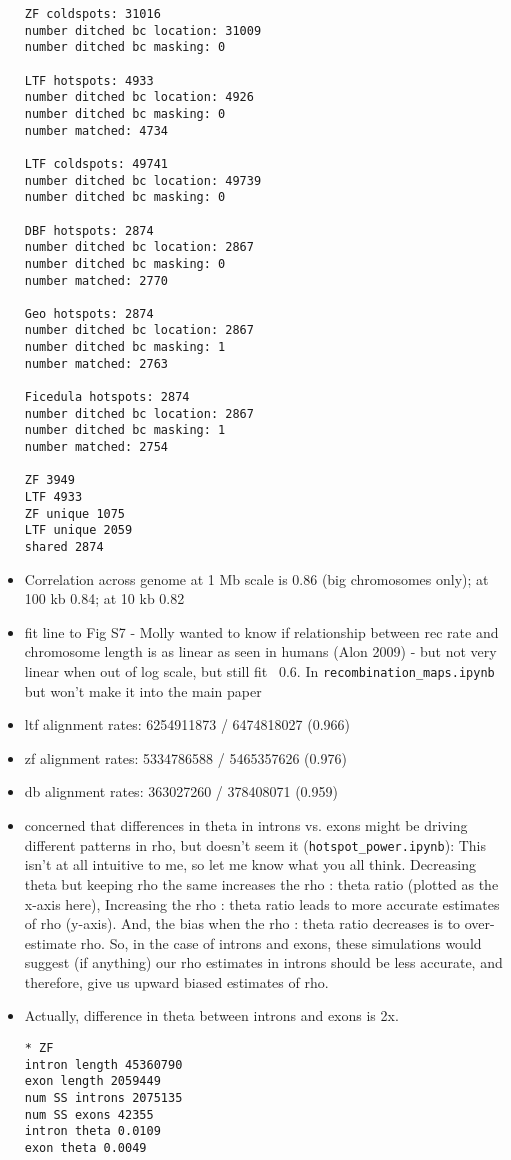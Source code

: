 \documentclass[idxtotoc,hyperref,openany,oneside]{labbook} %
\begin{document}
\begin{itemize}
\begin{verbatim}
ZF coldspots: 31016
number ditched bc location: 31009
number ditched bc masking: 0

LTF hotspots: 4933
number ditched bc location: 4926
number ditched bc masking: 0 
number matched: 4734

LTF coldspots: 49741
number ditched bc location: 49739
number ditched bc masking: 0

DBF hotspots: 2874
number ditched bc location: 2867
number ditched bc masking: 0
number matched: 2770

Geo hotspots: 2874
number ditched bc location: 2867
number ditched bc masking: 1
number matched: 2763

Ficedula hotspots: 2874
number ditched bc location: 2867
number ditched bc masking: 1
number matched: 2754

ZF 3949
LTF 4933
ZF unique 1075
LTF unique 2059
shared 2874
\end{verbatim}
\item Correlation across genome at 1 Mb scale is 0.86 (big chromosomes only); at 100 kb 0.84; at 10 kb 0.82
\item fit line to Fig S7 - Molly wanted to know if relationship between rec rate and chromosome length is as linear as seen in humans (Alon 2009) - but not very linear when out of log scale, but still fit ~0.6. In \verb+recombination_maps.ipynb+ but won't make it into the main paper
\item ltf alignment rates: 6254911873 / 6474818027 (0.966)
\item zf alignment rates: 5334786588 / 5465357626 (0.976)
\item db alignment rates: 363027260 / 378408071 (0.959)
\item concerned that differences in theta in introns vs. exons might be driving different patterns in rho, but doesn't seem it (\verb+hotspot_power.ipynb+): This isn't at all intuitive to me, so let me know what you all think. Decreasing theta but keeping rho the same increases the rho : theta ratio (plotted as the x-axis here), Increasing the rho : theta ratio leads to more accurate estimates of rho (y-axis). And, the bias when the rho : theta ratio decreases is to over-estimate rho. So, in the case of introns and exons, these simulations would suggest (if anything) our rho estimates in introns should be less accurate, and therefore, give us upward biased estimates of rho.
\item Actually, difference in theta between introns and exons is 2x.
\begin{verbatim}
* ZF
intron length 45360790
exon length 2059449
num SS introns 2075135
num SS exons 42355
intron theta 0.0109
exon theta 0.0049


\end{verbatim}
\end{itemize}
\end{document}

